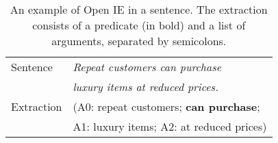 \documentclass[letterpaper]{article} \usepackage{aaai20}  \usepackage{times}  \usepackage{helvet} \usepackage{courier}  \usepackage[hyphens]{url}  \urlstyle{rm} \def\UrlFont{\rm}  \usepackage{graphicx}  \frenchspacing  \setlength{\pdfpagewidth}{8.5in}  \setlength{\pdfpageheight}{11in}
\begin{document}
\begin{table}[t!]
\begin{center}
\begin{tabular}{|l|l|}
\hline 
Sentence & \emph{Repeat customers can purchase} \\ 
& \emph{luxury items at reduced prices.}\\ 
\hline 
Extraction & (A0: repeat customers; \textbf{can purchase}; \\
&A1: luxury items; A2: at reduced prices)\\
\hline
\end{tabular}
\end{center}
\caption{An example of Open IE in a sentence. The extraction consists of a predicate (in bold) and a list of arguments, separated by semicolons.}
\label{simple_example}
\end{table}
\end{document}
